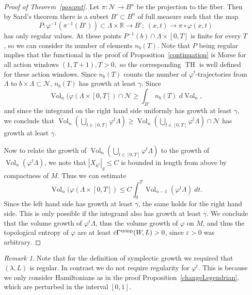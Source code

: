 \documentclass{amsart}
\newcommand{\Ncal}{{\mathcal{N}}}
\newcommand{\RR}{\mathbb{R}}
\newcommand{\Vol}{\operatorname{Vol}}
\renewcommand{\TH}{\operatorname{TH}}
\theoremstyle{definition}
\theoremstyle{remark}
\newtheorem{remark}[proposition]{Remark}
\numberwithin{equation}{section}
\begin{document}
\begin{proof}[Proof of Theorem~\ref{poscont}]
Let $\pi:\Ncal\to B^n$ be the projection to the fiber. Then by Sard's theorem there is a subset $B'\subset B^n$ of full measure such that the map 
$$P:\varphi^{-1}(\pi^{-1}(B'))\subset\Lambda\times\RR\to B';\; (x,t)\to \pi\circ\varphi(x,t)$$ 
has only regular values. At these points $P^{-1}(b)\cap\Lambda\times[0,T]$ is finite for every $T$, so we can consider its number of elements $n_b(T)$.
Note that $P$ being regular implies that the functional in the proof of Proposition~\ref{continuation} is Morse for all action windows $(1,T+1), T>0,$ so the corresponding $\TH$ is well defined for these action windows. Since $n_b(T)$ counts the number of $\varphi^t$-trajectories from $\Lambda$ to $b\times\Lambda\subset\Ncal$, $n_b(T)$ has growth at least $\gamma$. 
Since
$$\Vol_n(\varphi(\Lambda\times[0,T])\cap\Ncal\geq \int_{B'} n_b(T)\; d\Vol_{n},$$
and since the integrand on the right hand side uniformly has growth at least $\gamma$, we conclude that $\Vol_n(\bigcup_{t\in[0,T]}\varphi^t\Lambda)\geq \Vol_n(\bigcup_{t\in[0,T]}\varphi^t\Lambda)\cap\Ncal$ has growth at least $\gamma$. 

Now to relate the growth of $\Vol_n(\bigcup_{t\in[0,T]} \varphi^t\Lambda)$ to the growth of $\Vol_n(\varphi^t\Lambda)$, we note that $|X_{h^t}|_g\leq C$ is bounded in length from above by compactness of $M$. Thus we can estimate
$$\Vol_n(\varphi(\Lambda\times[0,T])\leq C\int_0^T \Vol_{n-1}(\varphi^t\Lambda)\;dt.$$
Since the left hand side has growth at least $\gamma$, the same holds for the right hand side. This is only possible if the integrand also has growth at least $\gamma$. We conclude that the volume growth of $\varphi^t\Lambda$, thus the volume growth of $\varphi$ on $M$, and thus the topological entropy of $\varphi$ are at least $c\Gamma^{\rm symp}(W,L)>0$, since $\varepsilon>0$ was arbitrary. 
\end{proof}

\begin{remark}
	Note that for the definition of symplectic growth we required that $(\lambda,L)$ is regular. In contrast we do not require regularity for $\varphi^t$. This is because we only consider Hamiltonians as in the proof Proposition~\ref{changeLegendrian}, which are perturbed in the interval $[0,1]$.
\end{remark}
\end{document}
